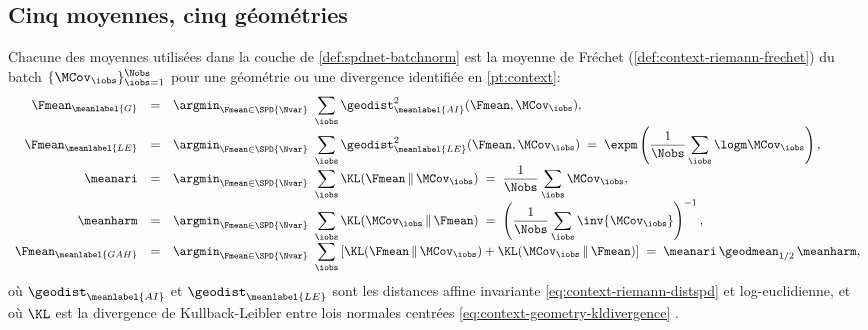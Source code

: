 \subsection{Cinq moyennes, cinq géométries}
\label{sec:spdnet-batchnorm-moyennes}

\begin{proposition}
\label{prop:spdnet-moyennes-frechet}
  Chacune des moyennes utilisées dans la couche de \cref{def:spdnet-batchnorm}
  est la moyenne de Fréchet (\cref{def:context-riemann-frechet}) du batch
  $\{\MCov_\iobs\}_{\iobs=1}^{\Nobs}$ pour une géométrie ou une divergence
  identifiée en \cref{pt:context}:
  \begin{equation}
    \begin{array}{rcl}
      \Fmean_{\meanlabel{G}}
        &=& \displaystyle\argmin_{\Fmean\in\SPD{\Nvar}}\ \sum_{\iobs}\geodist^2_{\meanlabel{AI}}(\Fmean,\MCov_\iobs),
        \\[10pt]
      \Fmean_{\meanlabel{LE}}
        &=& \displaystyle\argmin_{\Fmean\in\SPD{\Nvar}}\ \sum_{\iobs}\geodist^2_{\meanlabel{LE}}(\Fmean,\MCov_\iobs)
        \;=\; \expm\left(\frac{1}{\Nobs}\sum_{\iobs}\logm\MCov_\iobs\right),
        \\[10pt]
      \meanari
        &=& \displaystyle\argmin_{\Fmean\in\SPD{\Nvar}}\ \sum_{\iobs}\KL(\Fmean\,\|\,\MCov_\iobs)
        \;=\; \frac{1}{\Nobs}\sum_{\iobs}\MCov_\iobs,
        \\[10pt]
      \meanharm
        &=& \displaystyle\argmin_{\Fmean\in\SPD{\Nvar}}\ \sum_{\iobs}\KL(\MCov_\iobs\,\|\,\Fmean)
        \;=\; \left(\frac{1}{\Nobs}\sum_{\iobs}\inv{\MCov_\iobs}\right)^{-1},
        \\[10pt]
      \Fmean_{\meanlabel{GAH}}
        &=& \displaystyle\argmin_{\Fmean\in\SPD{\Nvar}}\ \sum_{\iobs}\left[\KL(\Fmean\,\|\,\MCov_\iobs)+\KL(\MCov_\iobs\,\|\,\Fmean)\right]
        \;=\; \meanari\,\geodmean_{1/2}\,\meanharm,
    \end{array}
    \label{eq:spdnet-moyennes-frechet}
  \end{equation}
  où $\geodist_{\meanlabel{AI}}$ et $\geodist_{\meanlabel{LE}}$ sont les distances
  affine invariante \cref{eq:context-riemann-distspd} et log-euclidienne, et où
  $\KL$ est la divergence de Kullback-Leibler entre lois normales centrées
  \cref{eq:context-geometry-kldivergence}
  .
\end{proposition}

